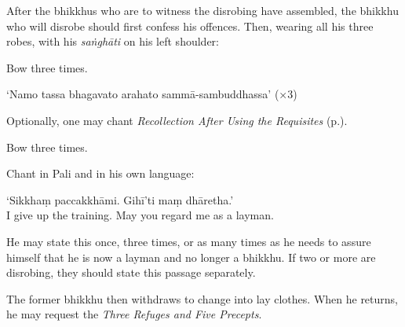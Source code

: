 After the bhikkhus who are to witness the disrobing have assembled, the bhikkhu
who will disrobe should first confess his offences. Then, wearing all his three
robes, with his \emph{saṅghāti} on his left shoulder:

Bow three times.

‘Namo tassa bhagavato arahato sammā-sambuddhassa’ (×3)

Optionally, one may chant \emph{Recollection After Using the Requisites}
(p.\pageref{recollection-after-using}).

Bow three times.

Chant in Pali and in his own language:

‘Sikkhaṃ paccakkhāmi. Gihī'ti maṃ dhāretha.’\\
I give up the training. May you regard me as a layman.

He may state this once, three times, or as many times as he needs to assure
himself that he is now a layman and no longer a bhikkhu. If two or more are
disrobing, they should state this passage separately.

The former bhikkhu then withdraws to change into lay clothes. When he returns,
he may request the \emph{Three Refuges and Five Precepts}.

